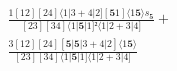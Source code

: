 \documentclass[varwidth, border=5pt]{standalone}
\begin{document}
\begin{my}
$\begin{gathered}
\scriptscriptstyle\frac{1[12][24]⟨1|3+4|2][𝟓1]⟨1𝟓⟩s_{𝟓}}{[23][34]⟨1|𝟓|1]²⟨1|2+3|4]} +\\
\scriptscriptstyle\frac{3[12][24][𝟓|𝟓|3+4|2]⟨1𝟓⟩}{[23][34]⟨1|𝟓|1]⟨1|2+3|4]} \phantom{+}
\end{gathered}$
\end{my}
\end{document}
